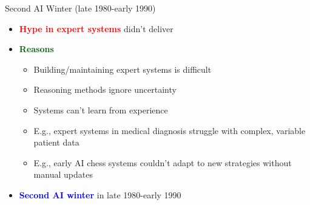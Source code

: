 \documentclass[
  10pt,
  ignorenonframetext,
]{beamer}
\providecommand{\tightlist}{%
  \setlength{\itemsep}{0pt}\setlength{\parskip}{0pt}}
\begin{document}
\begin{frame}{Second AI Winter (late 1980-early 1990)}
\label{second-ai-winter-late-1980-early-1990}
\begin{itemize}
\item
  \textbf{\textcolor{red}{Hype in expert systems}} didn't deliver
\item
  \textbf{\textcolor{darkgreen}{Reasons}}

  \begin{itemize}
  \tightlist
  \item
    Building/maintaining expert systems is difficult
  \item
    Reasoning methods ignore uncertainty
  \item
    Systems can't learn from experience
  \item
    E.g., expert systems in medical diagnosis struggle with complex,
    variable patient data
  \item
    E.g., early AI chess systems couldn't adapt to new strategies
    without manual updates
  \end{itemize}
\item
  \textbf{\textcolor{blue}{Second AI winter}} in late 1980-early 1990
\end{itemize}
\end{frame}
\end{document}

